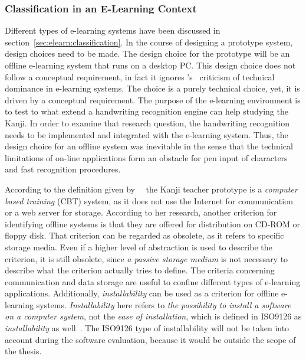 \subsubsection{Classification in an E-Learning Context}
\label{sec:concept:classificationinelearning}

Different types of e-learning systems have been discussed in 
section~\ref{sec:elearn:classification}. In the course of designing a prototype 
system, design choices need to be made.
The design choice for the prototype will be an offline e-learning system that 
runs on a desktop PC.
This design choice does not follow a conceptual requirement, in fact it ignores
's~\citeyear{Ivashin2009} criticism of technical 
dominance in e-learning systems. The choice is a purely technical choice, 
yet, it is driven by a conceptual requirement.
The purpose of the e-learning environment is to test to what extend a handwriting
recognition engine can help studying the Kanji. In order to examine that 
research question, the handwriting recognition needs to be implemented and 
integrated with the e-learning system. 
Thus, the design choice for an offline system was inevitable in the sense that 
the technical limitations of on-line applications form an obstacle for pen 
input of characters and fast recognition procedures.

According to the definition given 
by~~\citeyear{Richert2007} the Kanji teacher 
prototype is a \emph{computer based training} (CBT) system, as it does not use 
the Internet for communication or a web server for storage. 
According to her research, another criterion for identifying offline systems 
is that they are offered for distribution on CD-ROM or floppy disk.
That criterion can be regarded as obsolete, as it refers to specific storage 
media. Even if a higher level of abstraction is used to describe the
criterion, it is still obsolete, since \emph{a passive storage medium} is not 
necessary to describe what the criterion actually tries to define.
The criteria concerning communication and data storage are useful to confine
different types of e-learning applications.
Additionally, \emph{installability} can be used as a criterion for offline 
e-learning systems. \emph{Installability} here refers to 
\emph{the possibility to install a software on a computer system}, 
not the \emph{ease of installation}, 
which is defined in ISO9126 as \emph{installability} as 
well~. The ISO9126 type of installability will not be taken 
into account during the software evaluation, because it would be outside the 
scope of the thesis.


